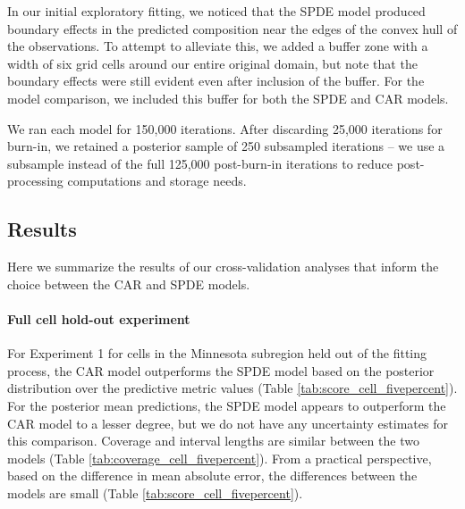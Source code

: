 \documentclass[12pt]{article}
\begin{document}
In our initial exploratory fitting, we noticed that the SPDE model
produced boundary effects in the predicted composition near the edges
of the convex hull of the observations. To attempt to alleviate this,
we added a buffer zone with a width of six grid cells around our entire
original domain, but note that the boundary effects were still evident
even after inclusion of the buffer. For the model comparison, we included
this buffer for both the SPDE and CAR models. 

We ran each model for 150,000 iterations. After discarding 25,000
iterations for burn-in, we retained a posterior sample of 250 subsampled
iterations -- we use a subsample instead of the full 125,000 post-burn-in
iterations to reduce post-processing computations and storage needs. 





\subsection{Results}

Here we summarize the results of our cross-validation analyses that
inform the choice between the CAR and SPDE models. 


\paragraph{Full cell hold-out experiment}

For Experiment 1 for cells in the Minnesota subregion held out of
the fitting process, the CAR model outperforms the SPDE model based
on the posterior distribution over the predictive metric values (Table
\ref{tab:score_cell_fivepercent}). For the posterior mean predictions,
the SPDE model appears to outperform the CAR model to a lesser degree,
but we do not have any uncertainty estimates for this comparison.
Coverage and interval lengths are similar between the two models (Table
\ref{tab:coverage_cell_fivepercent}). From a practical perspective,
based on the difference in mean absolute error, the differences between
the models are small (Table \ref{tab:score_cell_fivepercent}).
\end{document}

